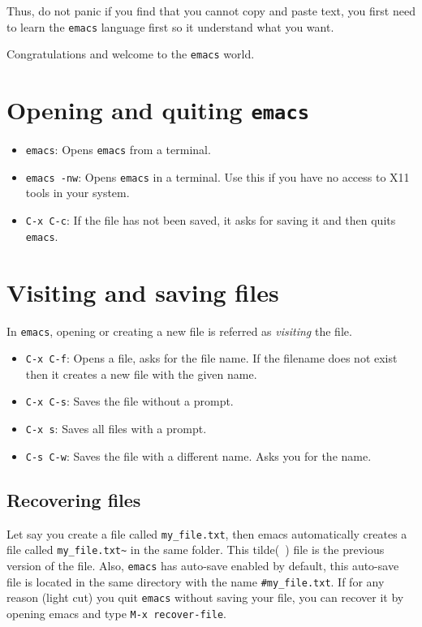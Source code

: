 \documentclass[12pt,a4paper,final]{article} %
\begin{document}
Thus, do not panic if you find that you cannot copy and paste text,
you first need to learn the \texttt{emacs} language first so it
understand what you want.

Congratulations and welcome to the \texttt{emacs} world.

\section{Opening and quiting \texttt{emacs}}
\begin{itemize}
\item \texttt{emacs}: Opens \texttt{emacs} from a terminal.
\item \texttt{emacs -nw}: Opens \texttt{emacs} in a terminal. Use
  this if you have no access to X11 tools in your system.
\item \texttt{C-x C-c}: If the file has not been saved, it asks for
  saving it and then quits \texttt{emacs}.
\end{itemize}

\section{Visiting and saving files}
In \texttt{emacs}, opening or creating a new file is referred as
\textit{visiting} the file.
\begin{itemize}
\item \texttt{C-x C-f}: Opens a file, asks for the file name. If the
  filename does not exist then it creates a new file with the given
  name.
\item \texttt{C-x C-s}: Saves the file without a prompt.
\item \texttt{C-x s}: Saves all files with a prompt.
\item \texttt{C-s C-w}: Saves the file with a different name. Asks
  you for the name.
\end{itemize}

\subsection{Recovering files}
Let say you create a file called \texttt{my\_file.txt}, then emacs
automatically creates a file called \texttt{my\_file.txt\~} in the
same folder. This tilde(\texttt{~}) file is the previous version of
the file. Also, \texttt{emacs} has auto-save enabled by default, this
auto-save file is located in the same directory with the name
\texttt{\#my\_file.txt}. If for any reason (light cut) you quit
\texttt{emacs} without saving your file, you can recover it by opening
emacs and type \texttt{M-x recover-file}.
\end{document}
